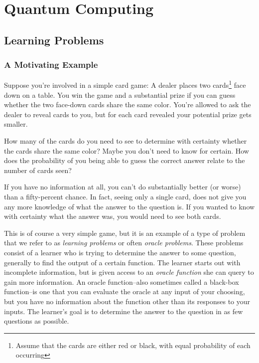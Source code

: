 \chapter{Quantum Computing}

\section{Learning Problems}

\subsection{A Motivating Example}


        Suppose you're involved in a simple card game: A dealer places two cards\footnote{Assume that the cards are
        either red or black, with equal probability of each occurring}  face down on a table. You win the game and a
        substantial prize if you can guess whether the two face-down cards share the same color. You're allowed to
        ask the dealer to reveal cards to you, but for each card revealed your potential prize gets smaller.

        How many of the cards do you need to see to determine with certainty whether the cards share the same
        color?  Maybe you don't need to know for certain. How does the probability of you being able to guess the
            correct answer relate to the number of cards seen?


        If you have no information at all, you can't do substantially better (or worse) than a fifty-percent
        chance. In fact, seeing only a single card, does not give you any more knowledge of what the answer to the
        question is. If you wanted to know with certainty what the answer was, you would need to see both cards.


        This is of course a very simple game, but it is an example of a type of problem that we refer to as
        \emph{learning problems} or often \emph{oracle problems}. These problems consist of a learner who is trying
        to determine the answer to some question, generally to find the output of a certain function. The learner
        starts out with incomplete information, but is given access to an \emph{oracle function} she can query to
        gain more information. An oracle function--also sometimes called a black-box function--is one that you can
        evaluate the oracle at any input of your choosing, but you have no information about the function other
        than its responses to your inputs. The learner's goal is to determine the answer to the question in as few
        questions as possible.

